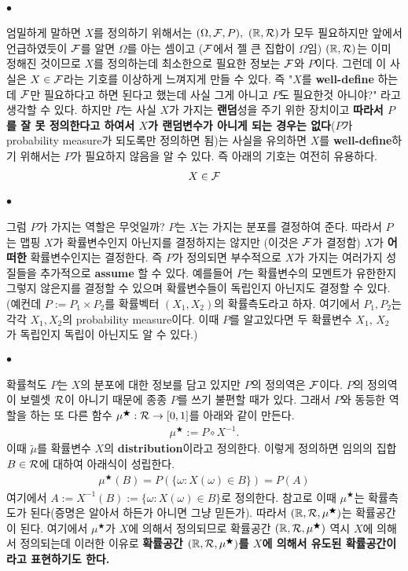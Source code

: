 \documentclass[12pt,oneside,english,a4paper]{article}
\def\ck{\paragraph{\Large$\bullet$}\Large}
\begin{document}
\ck 엄밀하게 말하면 $X$를 정의하기 위해서는 $(\Omega, {\cal F},P), ~ (\mathbb{R},{\cal R})$가 모두 필요하지만 앞에서 언급하였듯이 ${\cal F}$를 알면 $\Omega$를 아는 셈이고 (${\cal F}$에서 젤 큰 집합이 $\Omega$임) $(\mathbb{R},{\cal R})$는 이미 정해진 것이므로 $X$를 정의하는데 최소한으로 필요한 정보는 ${\cal F}$와 $P$이다. 그런데 이 사실은 $X \in {\cal F}$라는 기호를 이상하게 느껴지게 만들 수 있다. 즉 "$X$를 \textbf{well-define} 하는데 ${\cal F}$만 필요하다고 하면 된다고 했는데 사실 그게 아니고 $P$도 필요한것 아니야?" 라고 생각할 수 있다. 하지만 $P$는 사실 $X$가 가지는 \textbf{랜덤}성을 주기 위한 장치이고 \textbf{따라서 $P$를 잘 못 정의한다고 하여서 $X$가 랜덤변수가 아니게 되는 경우는 없다}($P$가 probability measure가 되도록만 정의하면 됨)는 사실을 유의하면 $X$를 \textbf{well-define}하기 위해서는 $P$가 필요하지 않음을 알 수 있다. 즉 아래의 기호는 여전히 유용하다. 
\begin{align*}
X \in {\cal F}
\end{align*}

\ck 그럼 $P$가 가지는 역할은 무엇일까? $P$는 $X$는 가지는 분포를 결정하여 준다. 따라서 $P$는 맵핑 $X$가 확률변수인지 아닌지를 결정하지는 않지만 (이것은 ${\cal F}$가 결정함) $X$가 \textbf{어떠한} 확률변수인지는 결정한다. 즉 $P$가 정의되면 부수적으로 $X$가 가지는 여러가지 성질들을 추가적으로 \textbf{assume} 할 수 있다. 예를들어 $P$는 확률변수의 모멘트가 유한한지 그렇지 않은지를 결정할 수 있으며 확률변수들이 독립인지 아닌지도 결정할 수 있다. (예컨데 $P:=P_1 \times P_2$를 확률벡터 $(X_1,X_2)$의 확률측도라고 하자. 여기에서 $P_1, P_2$는 각각 $X_1, X_2$의 probability measure이다. 이때 $P$를 알고있다면 두 확률변수 $X_1$, $X_2$ 가 독립인지 독립이 아닌지도 알 수 있다.)

\ck 확률척도 $P$는 $X$의 분포에 대한 정보를 담고 있지만 $P$의 정의역은 ${\cal F}$이다. $P$의 정의역이 보렐셋 ${\cal R}$이 아니기 때문에 종종 $P$를 쓰기 불편할 때가 있다. 그래서 $P$와 동등한 역할을 하는 또 다른 함수 $\mu^{\bigstar}: {\cal R} \rightarrow [0,1]$를 아래와 같이 만든다. 
\begin{align*}
\mu^{\bigstar} := P \circ X^{-1}. 
\end{align*}
이때 $\tilde \mu$를 확률변수 $X$의 \textbf{distribution}이라고 정의한다. 이렇게 정의하면 임의의 집합 $B \in {\cal R}$에 대하여 아래식이 성립한다. 
\begin{align*}
\mu^{\bigstar}(B)=P(\{\omega: X(\omega) \in B\})=P(A)
\end{align*}
여기에서 $A:=X^{-1}(B):=\{\omega: X(\omega) \in B\}$로 정의한다. 참고로 이때 $\mu^{\bigstar}$는 확률측도가 된다(증명은 알아서 하든가 아니면 그냥 믿든가). 따라서 $(\mathbb{R},{\cal R},\mu^{\bigstar})$는 확률공간이 된다. 여기에서 $\mu^{\bigstar}$가 $X$에 의해서 정의되므로 확률공간 $(\mathbb{R},{\cal R},\mu^{\bigstar})$ 역시 $X$에 의해서 정의되는데 이러한 이유로 \textbf{확률공간 $(\mathbb{R},{\cal R},\mu^{\bigstar})$를 $X$에 의해서 유도된 확률공간이라고 표현하기도 한다.}
\end{document}
